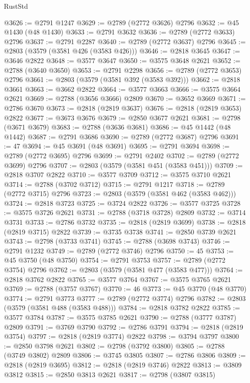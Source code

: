 \begin{lexlean}{RustStd}
\begin{coremodule}
@3626 := @2791 @1247
@3629 := @2789 (@2772 @3626) @2796
@3632 := @45 @1430 (@48 @1430)
@3633 := @2791 @3632
@3636 := @2789 (@2772 @3633) @2796
@3637 := @2791 @2287
@3640 := @2789 (@2772 @3637) @2796
@3645 := @2803 (@3579 (@3581 @426 (@3583 @426)))
@3646 := @2818 @3645
@3647 := @3646 @2822
@3648 := @3577 @3647
@3650 := @3575 @3648 @2621
@3652 := @2788 (@3640 @3650)
@3653 := @2791 @2298
@3656 := @2789 (@2772 @3653) @2796
@3661 := @2803 (@3579 (@3581 @392 (@3583 @392)))
@3662 := @2818 @3661
@3663 := @3662 @2822
@3664 := @3577 @3663
@3666 := @3575 @3664 @2621
@3669 := @2788 (@3656 @3666) @2809
@3670 := @3652 @3669
@3671 := @2786 @3670
@3673 := @2818 (@2819 @3637)
@3676 := @2818 (@2819 @3653) @2822
@3677 := @3673 @3676
@3679 := @2850 @3677 @2621
@3681 := @2798 (@3671 @3679)
@3683 := @2788 (@3636 @3681)
@3686 := @45 @1442 (@48 @1442)
@3687 := @2791 @3686
@3690 := @2789 (@2772 @3687) @2796
@3691 := 47
@3694 := @45 @3691 (@48 @3691)
@3695 := @2791 @3694
@3698 := @2789 (@2772 @3695) @2796
@3699 := @2791 @2402
@3702 := @2789 (@2772 @3699) @2796
@3707 := @2803 (@3579 (@3581 @451 (@3583 @451)))
@3709 := @2818 @3707 @2822
@3710 := @3577 @3709
@3712 := @3575 @3710 @2621
@3714 := @2788 (@3702 @3712)
@3715 := @2791 @1217
@3718 := @2789 (@2772 @3715) @2796
@3723 := @2803 (@3579 (@3581 @462 (@3583 @462)))
@3724 := @2818 @3723
@3725 := @3724 @2822
@3726 := @3577 @3725
@3728 := @3575 @3726 @2621
@3731 := @2788 (@3718 @3728) @2809
@3732 := @3714 @3731
@3733 := @2786 @3732
@3735 := @2818 (@2819 @3699)
@3738 := @2818 (@2819 @3715) @2822
@3739 := @3735 @3738
@3741 := @2850 @3739 @2621
@3743 := @2798 (@3733 @3741)
@3745 := @2788 (@3698 @3743)
@3746 := @2791 @1232
@3749 := @2789 (@2772 @3746) @2796
@3750 := 45
@3753 := @45 @3750 (@48 @3750)
@3754 := @2791 @3753
@3757 := @2789 (@2772 @3754) @2796
@3762 := @2803 (@3579 (@3581 @477 (@3583 @477)))
@3764 := @2818 @3762 @2822
@3765 := @3577 @3764
@3767 := @3575 @3765 @2621
@3769 := @2788 (@3757 @3767)
@3770 := 46
@3773 := @45 @3770 (@48 @3770)
@3774 := @2791 @3773
@3777 := @2789 (@2772 @3774) @2796
@3782 := @2803 (@3579 (@3581 @488 (@3583 @488)))
@3784 := @2818 @3782 @2822
@3785 := @3577 @3784
@3787 := @3575 @3785 @2621
@3790 := @2788 (@3777 @3787) @2809
@3791 := @3769 @3790
@3792 := @2786 @3791
@3794 := @2818 (@2819 @3754)
@3797 := @2818 (@2819 @3774) @2822
@3798 := @3794 @3797
@3800 := @2850 @3798 @2621
@3802 := @2798 (@3792 @3800)
@3805 := @2788 (@3749 @3802) @2809
@3806 := @3745 @3805
@3807 := @2786 @3806
@3809 := @2818 (@2819 @3695)
@3812 := @2818 (@2819 @3746) @2822
@3813 := @3809 @3812
@3815 := @2850 @3813 @2621
@3817 := @2798 (@3807 @3815)

\end{coremodule}
\end{lexlean}

